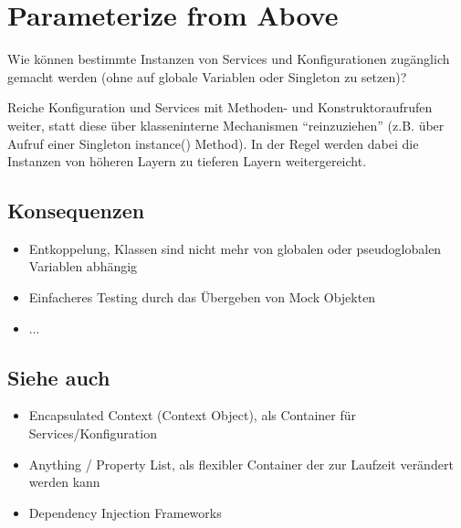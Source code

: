 \section{Parameterize from Above}

Wie können bestimmte Instanzen von Services und Konfigurationen zugänglich gemacht werden (ohne auf globale Variablen oder Singleton zu setzen)?

Reiche Konfiguration und Services mit Methoden- und Konstruktoraufrufen weiter, statt diese über klasseninterne Mechanismen ``reinzuziehen'' (z.B. über Aufruf einer Singleton instance() Method). In der Regel werden dabei die Instanzen von höheren Layern zu tieferen Layern weitergereicht.

\subsection*{Konsequenzen}

\begin{itemize}
	\item Entkoppelung, Klassen sind nicht mehr von globalen oder pseudoglobalen Variablen abhängig
	\item Einfacheres Testing durch das Übergeben von Mock Objekten
	\item ...
\end{itemize}

\subsection*{Siehe auch}

\begin{itemize}
	\item Encapsulated Context (Context Object), als Container für Services/Konfiguration
	\item Anything / Property List, als flexibler Container der zur Laufzeit verändert werden kann
	\item Dependency Injection Frameworks
\end{itemize}